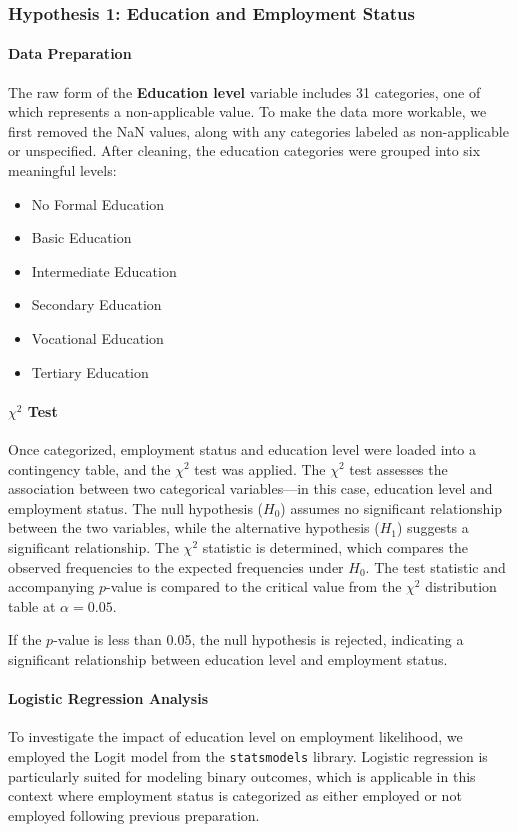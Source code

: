 \subsubsection{Hypothesis 1: Education and Employment Status}

\paragraph{Data Preparation}
The raw form of the \textbf{Education level} variable includes 31 categories, one of which represents a non-applicable value. To make the data more workable, we first removed the NaN values, along with any categories labeled as non-applicable or unspecified. After cleaning, the education categories were grouped into six meaningful levels:
\begin{itemize}
    \item No Formal Education 
    \item Basic Education 
    \item Intermediate Education 
    \item Secondary Education 
    \item Vocational Education 
    \item Tertiary Education 
\end{itemize}

\paragraph{$\chi^2$ Test}
Once categorized, employment status and education level were loaded into a contingency table, and the $\chi^2$ test was applied. The $\chi^2$ test assesses the association between two categorical variables—in this case, education level and employment status. The null hypothesis ($H_0$) assumes no significant relationship between the two variables, while the alternative hypothesis ($H_1$) suggests a significant relationship.
The $\chi^2$ statistic is determined, which compares the observed frequencies to the expected frequencies under $H_0$.
The test statistic and accompanying $p$-value is compared to the critical value from the $\chi^2$ distribution table at $\alpha = 0.05$.

If the $p$-value is less than 0.05, the null hypothesis is rejected, indicating a significant relationship between education level and employment status.

\paragraph{Logistic Regression Analysis}
To investigate the impact of education level on employment likelihood, we employed the Logit model from the \texttt{statsmodels} library. Logistic regression is particularly suited for modeling binary outcomes, which is applicable in this context where employment status is categorized as either employed or not employed following previous preparation.

